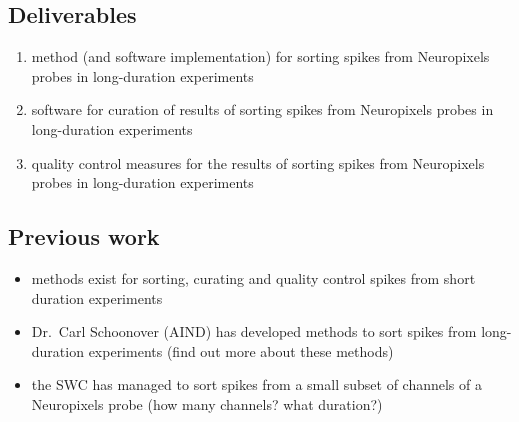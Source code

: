 
\subsection{Deliverables}

\begin{enumerate}

    \item method (and software implementation) for sorting spikes from
    Neuropixels probes in long-duration experiments

    \item software for curation of results of sorting spikes from Neuropixels
    probes in long-duration experiments

    \item quality control measures for the results of sorting spikes from
    Neuropixels probes in long-duration experiments

\end{enumerate}

\subsection{Previous work}

\begin{itemize}

    \item methods exist for sorting, curating and quality control spikes from
    short duration experiments

    \item Dr.~Carl Schoonover (AIND) has developed methods to sort spikes from
    long-duration experiments (find out more about these methods)

    \item the SWC has managed to sort spikes from a small subset of channels of
        a Neuropixels probe (how many channels? what duration?)

\end{itemize}

